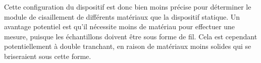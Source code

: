 Cette configuration du dispositif est donc bien moins précise pour déterminer le module de cisaillement de différents matériaux que la dispositif statique. Un avantage potentiel est qu'il nécessite moins de matériau pour effectuer une mesure, puisque les échantillons doivent être sous forme de fil. Cela est cependant potentiellement à double tranchant, en raison de matériaux moins solides qui se briseraient sous cette forme.


